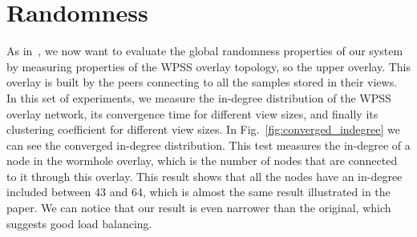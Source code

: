 \section{Randomness}
\label{sec:eval_randomness}
As in~\cite{wormhole}, we now want to evaluate the global randomness properties of our system by measuring properties of the \ac{WPSS} overlay topology, so the upper overlay. This overlay is built by the peers connecting to all the samples stored in their views. In this set of experiments, we measure the in-degree distribution of the \ac{WPSS} overlay network, its convergence time for different view sizes, and finally its clustering coefficient for different view sizes. In Fig.~\ref{fig:converged_indegree} we can see the converged in-degree distribution. This test measures the in-degree of a node in the wormhole overlay, which is the number of nodes that are connected to it through this overlay. This result shows that all the nodes have an in-degree included between 43 and 64, which is almost the same result illustrated in the paper. We can notice that our result is even narrower than the original, which suggests good load balancing. 

